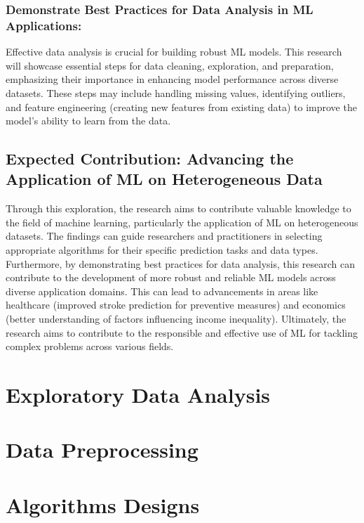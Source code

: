 \documentclass[runningheads]{paper}
\begin{document}
\subsubsection{Demonstrate Best Practices for Data Analysis in ML Applications:}
Effective data analysis is crucial for building robust ML models. This research 
will showcase essential steps for data cleaning, exploration, and preparation, 
emphasizing their importance in enhancing model performance across diverse 
datasets. These steps may include handling missing values, identifying outliers, 
and feature engineering (creating new features from existing data) to improve 
the model's ability to learn from the data.

\subsection{Expected Contribution: Advancing the Application of ML on Heterogeneous Data}
Through this exploration, the research aims to contribute valuable knowledge to 
the field of machine learning, particularly the application of ML on 
heterogeneous datasets.  The findings can guide researchers and practitioners 
in selecting appropriate algorithms for their specific prediction tasks and 
data types.  Furthermore, by demonstrating best practices for data analysis, 
this research can contribute to the development of more robust and reliable ML 
models across diverse application domains. This can lead to advancements in 
areas like healthcare (improved stroke prediction for preventive measures) and 
economics (better understanding of factors influencing income inequality).  
Ultimately, the research aims to contribute to the responsible and effective use 
of ML for tackling complex problems across various fields.
\section{Exploratory Data Analysis}

\section{Data Preprocessing}

\section{Algorithms Designs}
\end{document}
